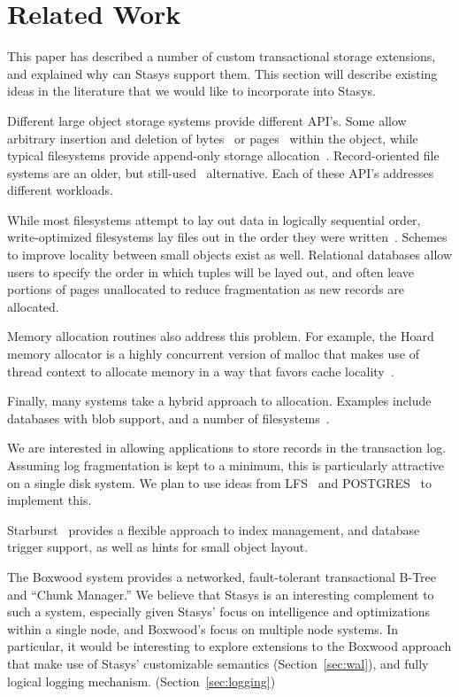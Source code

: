 \documentclass[letterpaper,twocolumn,10pt]{article}
\newcommand{\yad}{Stasys\xspace}
\newcommand{\yads}{Stasys'\xspace}
\begin{document}
\section{Related Work}

This paper has described a number of custom transactional storage
extensions, and explained why can \yad support them.  This section
will describe existing ideas in the literature that we would like to
incorporate into \yad.

Different large object storage systems provide different API's.
Some allow arbitrary insertion and deletion of bytes~\cite{esm} or
pages~\cite{sqlserver} within the object, while typical filesystems
provide append-only storage allocation~\cite{ffs}.
Record-oriented file systems are an older, but still-used~\cite{gfs}
alternative. Each of these API's addresses 
different workloads.

While most filesystems attempt to lay out data in logically sequential
order, write-optimized filesystems lay files out in the order they
were written~\cite{lfs}.  Schemes to improve locality between small
objects exist as well. Relational databases allow users to specify the order
in which tuples will be layed out, and often leave portions of pages
unallocated to reduce fragmentation as new records are allocated.

Memory allocation routines also address this problem.  For example, the Hoard memory
allocator is a highly concurrent version of malloc that
makes use of thread context to allocate memory in a way that favors
cache locality~\cite{hoard}.  %

Finally, many systems take a hybrid approach to allocation.  Examples include
databases with blob support, and a number of
filesystems~\cite{reiserfs,ffs}.

We are interested in allowing applications to store records in
the transaction log.  Assuming log fragmentation is kept to a
minimum, this is particularly attractive on a single disk system.  We
plan to use ideas from LFS~\cite{lfs} and POSTGRES~\cite{postgres}
to implement this.

Starburst~\cite{starburst} provides a flexible approach to index
management, and database trigger support, as well as hints for small
object layout.

The Boxwood system provides a networked, fault-tolerant transactional
B-Tree and ``Chunk Manager.''  We believe that \yad is an interesting
complement to such a system, especially given \yads focus on
intelligence and optimizations within a single node, and Boxwood's
focus on multiple node systems.  In particular, it would be
interesting to explore extensions to the Boxwood approach that make
use of \yads customizable semantics (Section~\ref{sec:wal}), and fully logical logging
mechanism. (Section~\ref{sec:logging})
\end{document}
